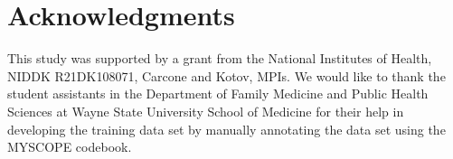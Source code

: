 \documentclass{amia_summit_2018}
\begin{document}
\section*{Acknowledgments}
This study was supported by a grant from the National Institutes of Health, NIDDK R21DK108071, Carcone and Kotov, MPIs. We would like to thank the student assistants in the Department of Family Medicine and Public Health Sciences at Wayne State University School of Medicine for their help in developing the training data set by manually annotating the data set using the MYSCOPE codebook. 



\end{document}
